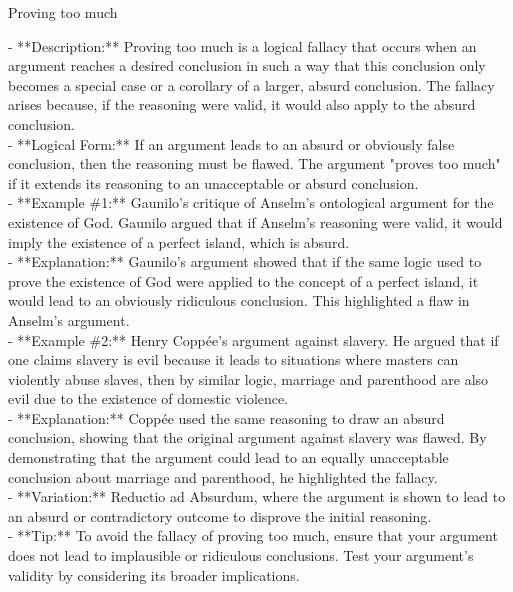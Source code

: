 \documentclass[a4paper,12pt,single,pdftex]{scrbook}
\begin{document}
Proving too much
    
      - **Description:** Proving too much is a logical fallacy that occurs when an argument reaches a desired conclusion in such a way that this conclusion only becomes a special case or a corollary of a larger, absurd conclusion. The fallacy arises because, if the reasoning were valid, it would also apply to the absurd conclusion.
    \\

    
      - **Logical Form:** If an argument leads to an absurd or obviously false conclusion, then the reasoning must be flawed. The argument "proves too much" if it extends its reasoning to an unacceptable or absurd conclusion.
    \\

    
      - **Example \#1:** Gaunilo’s critique of Anselm’s ontological argument for the existence of God. Gaunilo argued that if Anselm's reasoning were valid, it would imply the existence of a perfect island, which is absurd.
    \\

    
      - **Explanation:** Gaunilo's argument showed that if the same logic used to prove the existence of God were applied to the concept of a perfect island, it would lead to an obviously ridiculous conclusion. This highlighted a flaw in Anselm's argument.
    \\

    
      - **Example \#2:** Henry Coppée’s argument against slavery. He argued that if one claims slavery is evil because it leads to situations where masters can violently abuse slaves, then by similar logic, marriage and parenthood are also evil due to the existence of domestic violence.
    \\

    
      - **Explanation:** Coppée used the same reasoning to draw an absurd conclusion, showing that the original argument against slavery was flawed. By demonstrating that the argument could lead to an equally unacceptable conclusion about marriage and parenthood, he highlighted the fallacy.
    \\

    
      - **Variation:** Reductio ad Absurdum, where the argument is shown to lead to an absurd or contradictory outcome to disprove the initial reasoning.
    \\

    
      - **Tip:** To avoid the fallacy of proving too much, ensure that your argument does not lead to implausible or ridiculous conclusions. Test your argument's validity by considering its broader implications.
    \\
\end{document}
